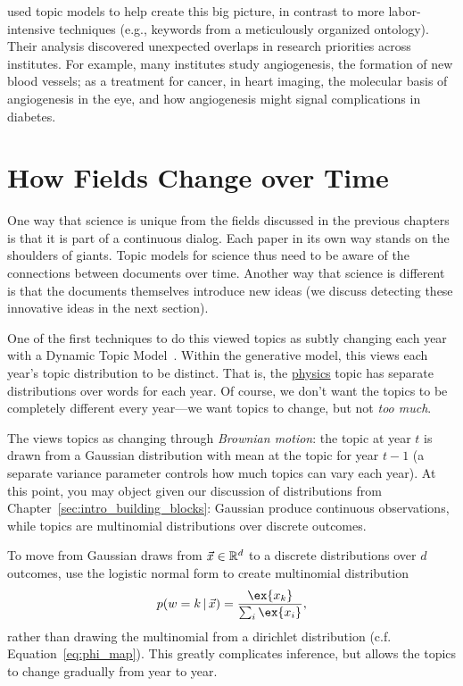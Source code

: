 \citet{talley-11} used topic models to help create this big picture,
in contrast to more labor-intensive techniques (e.g., keywords from a
meticulously organized ontology).  Their analysis discovered
unexpected overlaps in research priorities across institutes.  For
example, many institutes study angiogenesis, the formation of new
blood vessels; as a treatment for cancer, in heart imaging, the
molecular basis of angiogenesis in the eye, and how angiogenesis might
signal complications in diabetes.

\section{How Fields Change over Time}
\label{sec:sci_change}

One way that science is unique from the fields discussed in the
previous chapters is that it is part of a continuous dialog.  Each
paper in its own way stands on the shoulders of giants. Topic models
for science thus need to be aware of the connections between documents
over time.  Another way that science is different is that the
documents themselves introduce new ideas (we discuss detecting these
innovative ideas in the next section).

One of the first techniques to do this viewed topics as subtly
changing each year with a Dynamic Topic
Model~\citep[]{blei-06b}.  Within the generative model, this
views each year's topic distribution to be distinct.  That is, the
\underline{physics} topic has separate distributions over words for
each year.  Of course, we don't want the topics to be completely
different every year---we want topics to change, but not \emph{too
  much}.

The  views topics as changing through \emph{Brownian
  motion}: the topic at year $t$ is drawn from a Gaussian distribution
with mean at the topic for year $t-1$ (a separate variance parameter
controls how much topics can vary each year).  At this point, you may
object given our discussion of distributions from
Chapter~\ref{sec:intro_building_blocks}: Gaussian produce continuous
observations, while topics are multinomial distributions over discrete
outcomes.

To move from Gaussian draws from $\vec x \in \mathbb{R}^d$ to a discrete distributions
over $d$ outcomes, \citet{blei-06b} use the logistic normal form to
create multinomial distribution
\begin{equation}
p(w=k \g \vec x)  = \frac{\ex{x_k}}{\sum_i \ex{x_i}},
\end{equation}
rather than drawing the multinomial from a dirichlet distribution
(c.f. Equation~\ref{eq:phi_map}).
This greatly complicates inference, but allows the topics to change
gradually from year to year.

